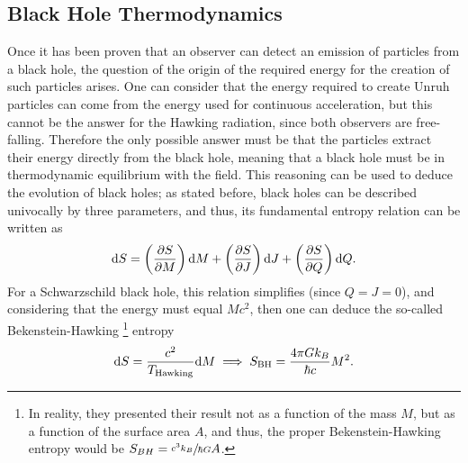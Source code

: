 \subsection{Black Hole Thermodynamics}
Once it has been proven that an observer can detect an emission of particles from a black hole, the question of the origin of the required energy for the creation of such particles arises. One can consider that the energy required to create Unruh particles can come from the energy used for continuous acceleration, but this cannot be the answer for the Hawking radiation, since both observers are free-falling. Therefore the only possible answer must be that the particles extract their energy directly from the black hole, meaning that a black hole must be in thermodynamic equilibrium with the field. This reasoning can be used to deduce the evolution of black holes; as stated before, black holes can be described univocally by three parameters, and thus, its  fundamental entropy relation can be written as
\begin{equation}
	\text{d} S=\left(\frac{\partial S}{\partial M}\right)\text{d} M+\left(\frac{\partial S}{\partial J}\right)\text{d} J+\left(\frac{\partial S}{\partial Q}\right)\text{d} Q.
\end{equation}
For a Schwarzschild black hole, this relation simplifies (since $Q=J=0$), and considering that the energy must equal $Mc^2$, then one can deduce the so-called Bekenstein-Hawking \footnote{In reality, they presented their result not as a function of the mass $M$, but as a function of the surface area $A$, and thus, the proper Bekenstein-Hawking entropy would be $S_{BH}=\sfrac{c^3k_B}{\hbar G}A$.} entropy 
\begin{equation}
	\text{d} S=\frac{c^2}{T_{\text{Hawking}}}\text{d} M\implies S_{\text{BH}}=\frac{4\pi Gk_B}{\hbar c}M^2.
\end{equation}

